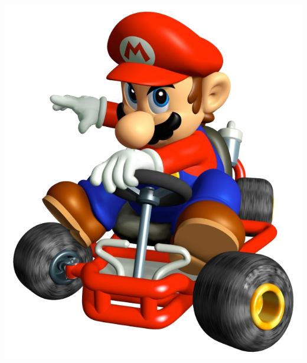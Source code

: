 \documentclass{beamer}
\begin{document}
\begin{frame}
\begin{center}
\includegraphics[width=.70\textwidth]{Images/Mario.png}
\end{center}
\end{frame}

\end{document}
